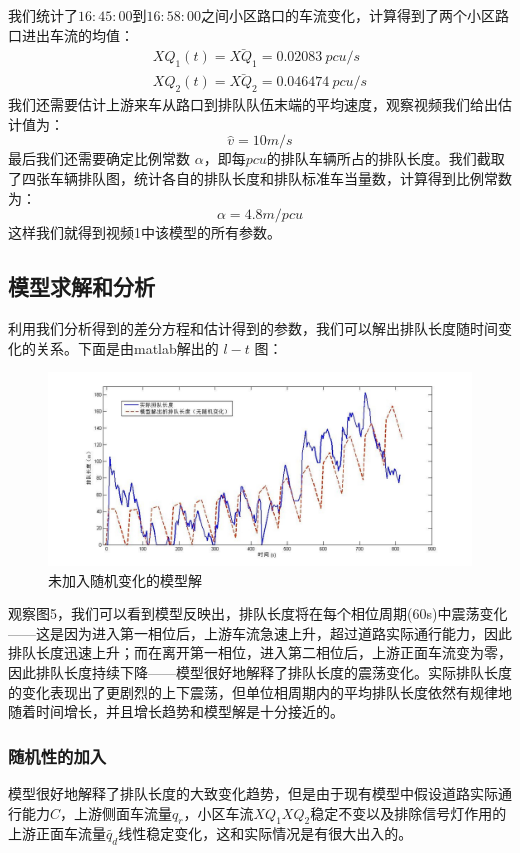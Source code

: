 \documentclass{cumcmart}
\begin{document}
我们统计了$ {16:45:00}$到$ {16:58:00}$之间小区路口的车流变化，计算得到了两个小区路口进出车流的均值：
\begin{align*}
{XQ}_{1}\left( t \right)=\bar{{XQ}_{1}}=0.02083\  pcu/s\\
{XQ}_{2}\left( t \right)=\bar{{XQ}_{2}}=0.046474\  pcu/s
\end{align*}
我们还需要估计上游来车从路口到排队队伍末端的平均速度，观察视频我们给出估计值为：
\[
\hat{v}=10 m/s
\]
最后我们还需要确定比例常数 $ {\alpha
}$，即每$ {pcu}$的排队车辆所占的排队长度。我们截取了四张车辆排队图，统计各自的排队长度和排队标准车当量数，计算得到比例常数为：
\[
\alpha =4.8 m/pcu
\]
这样我们就得到视频1中该模型的所有参数。

\subsection{模型求解和分析}

利用我们分析得到的差分方程和估计得到的参数，我们可以解出排队长度随时间变化的关系。下面是由matlab解出的
$l-t$ 图：
\begin{figure}[h]
\centering
\includegraphics[width=.6\textwidth]{fig5}
\caption{未加入随机变化的模型解}
\end{figure}

观察图5，我们可以看到模型反映出，排队长度将在每个相位周期(60s)中震荡变化------这是因为进入第一相位后，上游车流急速上升，超过道路实际通行能力，因此排队长度迅速上升；而在离开第一相位，进入第二相位后，上游正面车流变为零，因此排队长度持续下降------模型很好地解释了排队长度的震荡变化。实际排队长度的变化表现出了更剧烈的上下震荡，但单位相周期内的平均排队长度依然有规律地随着时间增长，并且增长趋势和模型解是十分接近的。

\subsubsection{随机性的加入}
 
模型很好地解释了排队长度的大致变化趋势，但是由于现有模型中假设道路实际通行能力$C$，上游侧面车流量$q_{r}，$小区车流${XQ}_{1}{XQ}_{2}$稳定不变以及排除信号灯作用的上游正面车流量$\tilde{q_{d}}$线性稳定变化，这和实际情况是有很大出入的。
\end{document}
